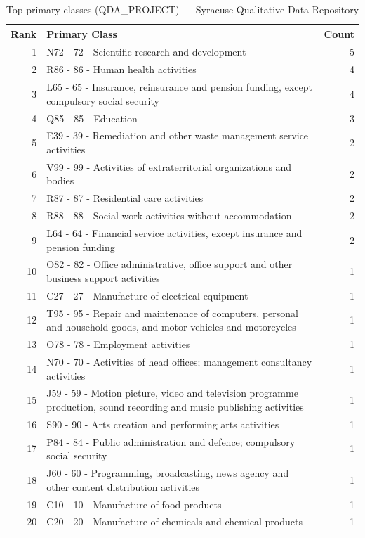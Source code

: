 \begin{table}[H]
    \centering
    \begin{tabular}{r p{10cm} r}
    \hline
    \textbf{Rank} & \textbf{Primary Class} & \textbf{Count} \\
    \hline
    1 & N72 - 72 - Scientific research and development & 5 \\
    2 & R86 - 86 - Human health activities & 4 \\
    3 & L65 - 65 - Insurance, reinsurance and pension funding, except compulsory social security & 4 \\
    4 & Q85 - 85 - Education & 3 \\
    5 & E39 - 39 - Remediation and other waste management service activities & 2 \\
    6 & V99 - 99 - Activities of extraterritorial organizations and bodies & 2 \\
    7 & R87 - 87 - Residential care activities & 2 \\
    8 & R88 - 88 - Social work activities without accommodation & 2 \\
    9 & L64 - 64 - Financial service activities, except insurance and pension funding & 2 \\
    10 & O82 - 82 - Office administrative, office support and other business support activities & 1 \\
    11 & C27 - 27 - Manufacture of electrical equipment & 1 \\
    12 & T95 - 95 - Repair and maintenance of computers, personal and household goods, and motor vehicles and motorcycles & 1 \\
    13 & O78 - 78 - Employment activities & 1 \\
    14 & N70 - 70 - Activities of head offices; management consultancy activities & 1 \\
    15 & J59 - 59 - Motion picture, video and television programme production, sound recording and music publishing activities & 1 \\
    16 & S90 - 90 - Arts creation and performing arts activities & 1 \\
    17 & P84 - 84 - Public administration and defence; compulsory social security & 1 \\
    18 & J60 - 60 - Programming, broadcasting, news agency and other content distribution activities & 1 \\
    19 & C10 - 10 - Manufacture of food products & 1 \\
    20 & C20 - 20 - Manufacture of chemicals and chemical products & 1 \\
    \hline
    \end{tabular}
    \caption{Top primary classes (QDA\_PROJECT) --- Syracuse Qualitative Data Repository}
\end{table}

